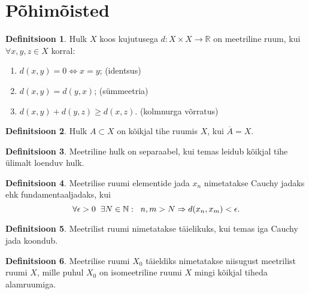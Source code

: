 \documentclass{article}[12pt]
\newcommand{\h}{\hspace{0.2cm}}
\newcommand{\R}{\mathbb{R}}
\newcommand{\N}{\mathbb{N}}
\theoremstyle{definition}
\newtheorem{definition}{Definitsioon}[section]
\theoremstyle{definition}
\theoremstyle{definition}
\theoremstyle{break}
\begin{document}
\section{Põhimõisted}

\begin{definition}
	Hulk $X$ koos kujutusega $d:X\times X\rightarrow \R$ on meetriline ruum, kui $\forall x,y,z\in X$ korral:
	\begin{enumerate}
		\item $d(x,y)=0 \Leftrightarrow x=y$; \hfill (identsus)
		\item $d(x,y) = d(y,x)$; \hfill (sümmeetria)
		\item $d(x,y) + d(y,z) \geq d(x,z)$. \hfill (kolmnurga võrratus)
	\end{enumerate}
\end{definition}

\begin{definition}
	Hulk $A\subset X$ on kõikjal tihe ruumis $X$, kui $\overline{A} = X$.
\end{definition}

\begin{definition}
	Meetriline hulk on separaabel, kui temas leidub kõikjal tihe ülimalt loenduv hulk.
\end{definition}

\begin{definition}
	Meetrilise ruumi elementide jada $x_n$ nimetatakse Cauchy jadaks ehk fundamentaaljadaks, kui
	\[
		\forall \epsilon > 0\h\exists N\in\N:\h n,m>N\Rightarrow d(x_n,x_m)<\epsilon.
	\]
\end{definition}

\begin{definition}
	Meetrilist ruumi nimetatakse täielikuks, kui temas iga Cauchy jada koondub.
\end{definition}

\begin{definition}
	Meetrilise ruumi $X_0$ täieldiks nimetatakse niisugust meetrilist ruumi $X$, mille puhul $X_0$ on isomeetriline ruumi $X$ mingi kõikjal tiheda alamruumiga.
\end{definition}
\end{document}
